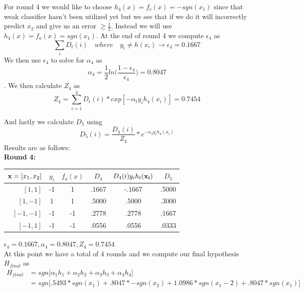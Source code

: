 \documentclass[11pt,a4paper]{article}
\begin{document}
\begin{itemize}
			For round 4 we would like to choose $h_4(x) = f_c(x) = -sgn(x_1)$ since that weak classifier hasn't been utilized yet but we see that if we do it will incorrectly predict $x_2$ and give us an error $\geq \frac{1}{2}$. Instead we will use $h_4(x) = f_a(x) = sgn(x_1)$.  At the end of round 4 we compute $\epsilon_4$ as $$\displaystyle\sum_{i} D_t (i) \quad where \quad y_i \neq h(x_i) \rightarrow \epsilon_4 = 0.1667$$ We then use $\epsilon_4$ to solve for $\alpha_4$ as $$\alpha_4 = \frac{1}{2} ln \Big( \frac{1-\epsilon_4}{\epsilon_4} \Big) = 0.8047$$. We then calculate $Z_4$ as $$Z_4 = \displaystyle\sum_{i=1}^4 D_t(i)*exp[-\alpha_t y_i h_4(x_i)] = 0.7454$$
			
			And lastly we calculate $D_5$ using $$D_5(i) = \frac{D_4(i)}{Z_4}*e^{-\alpha_4 y_i h_4(x_i)}$$ Results are as follows:\\
			
			\textbf{Round 4:}
			\begin{center}
				\begin{tabular}{rccccc}
					\toprule
					${\bf x} = [x_1,x_2]$ & $y_i$ & $f_a(x)$ & $D_4$ & $D_{4}(i)y_{i}h_t({\bf x_i})$ & $D_5$ \\
					\midrule
					$[1,  1]$             & -1    & 1        & .1667 & -.1667                        & .5000      \\
					$[1, -1]$             & 1     & 1        & .5000 & .5000                         & .3000      \\
					$[-1,-1]$             & -1    & -1       & .2778 & .2778                         & .1667      \\
					$[-1, 1]$             & -1    & -1       & .0556 & .0556                         & .0333      \\
					\bottomrule
				\end{tabular}
			\end{center}
			$\epsilon_4 = 0.1667, \alpha_4 = 0.8047, Z_4 = 0.7454$ \\
			
			At this point we have a total of 4 rounds and we compute our final hypothesis $H_{final}$ as
			\begin{align*}
				H_{final} &= sgn \Big[ \alpha_1 h_1 + \alpha_2 h_2 + \alpha_3 h_3 + \alpha_4 h_4 \Big] \\
				 &= sgn \Big[ .5493*sgn(x_1) + .8047 *-sgn(x_2) + 1.0986 *sgn(x_1 - 2) + .8047*sgn(x_1) \Big]
			\end{align*}
		\end{itemize}
	
\end{document}
